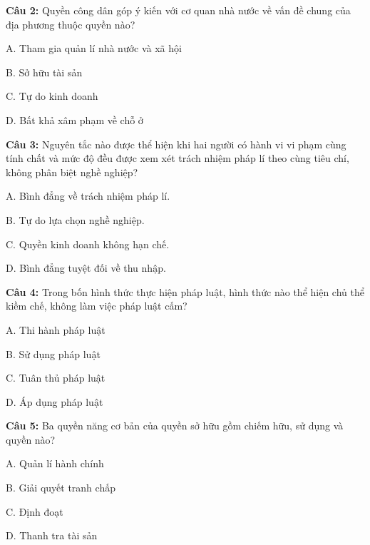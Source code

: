 \documentclass[12pt,a4paper]{article}
\begin{document}
\par\noindent\begin{minipage}{\linewidth}
\noindent\textbf{Câu 2:} Quyền công dân góp ý kiến với cơ quan nhà nước về vấn đề chung của địa phương thuộc quyền nào?\par
\noindent A. Tham gia quản lí nhà nước và xã hội\par
\noindent B. Sở hữu tài sản\par
\noindent C. Tự do kinh doanh\par
\noindent D. Bất khả xâm phạm về chỗ ở\par
\end{minipage}\par\vspace{0.12cm}

\par\noindent\begin{minipage}{\linewidth}
\noindent\textbf{Câu 3:} Nguyên tắc nào được thể hiện khi hai người có hành vi vi phạm cùng tính chất và mức độ đều được xem xét trách nhiệm pháp lí theo cùng tiêu chí, không phân biệt nghề nghiệp?\par
\noindent A. Bình đẳng về trách nhiệm pháp lí.\par
\noindent B. Tự do lựa chọn nghề nghiệp.\par
\noindent C. Quyền kinh doanh không hạn chế.\par
\noindent D. Bình đẳng tuyệt đối về thu nhập.\par
\end{minipage}\par\vspace{0.12cm}

\par\noindent\begin{minipage}{\linewidth}
\noindent\textbf{Câu 4:} Trong bốn hình thức thực hiện pháp luật, hình thức nào thể hiện chủ thể kiềm chế, không làm việc pháp luật cấm?\par
\noindent A. Thi hành pháp luật\par
\noindent B. Sử dụng pháp luật\par
\noindent C. Tuân thủ pháp luật\par
\noindent D. Áp dụng pháp luật\par
\end{minipage}\par\vspace{0.12cm}

\par\noindent\begin{minipage}{\linewidth}
\noindent\textbf{Câu 5:} Ba quyền năng cơ bản của quyền sở hữu gồm chiếm hữu, sử dụng và quyền nào?\par
\noindent A. Quản lí hành chính\par
\noindent B. Giải quyết tranh chấp\par
\noindent C. Định đoạt\par
\noindent D. Thanh tra tài sản\par
\end{minipage}\par\vspace{0.12cm}
\end{document}
